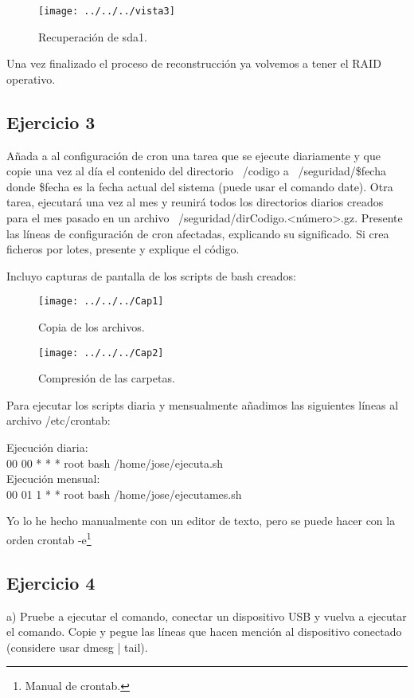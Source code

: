 \documentclass[a4paper, 11pt]{article} %
\begin{document}
\begin{figure}[htpb]
\centering
\texttt{[image: ../../../vista3]}
\caption{Recuperación de sda1.}
\end{figure}

Una vez finalizado el proceso de reconstrucción ya volvemos a tener el RAID operativo. 

\subsection{Ejercicio 3}
Añada a al configuración de cron una tarea que se ejecute diariamente y que copie una vez al día el contenido del directorio ~/codigo a ~/seguridad/\$fecha donde \$fecha es la fecha actual del sistema (puede usar el comando date). Otra tarea, ejecutará una vez al mes y reunirá todos los directorios diarios creados para el mes pasado en un archivo ~/seguridad/dirCodigo.<número>.gz. Presente las líneas de configuración de cron afectadas, explicando su significado. Si crea ficheros por lotes, presente y explique el código. 

Incluyo capturas de pantalla de los scripts de bash creados: 

\begin{figure}[htpb]
\centering
\texttt{[image: ../../../Cap1]}
\caption{Copia de los archivos.}
\end{figure}

\begin{figure}[htpb]
\centering
\texttt{[image: ../../../Cap2]}
\caption{Compresión de las carpetas.}
\end{figure}

Para ejecutar los scripts diaria y mensualmente añadimos las siguientes líneas al archivo /etc/crontab: 

Ejecución diaria:\\
00 00   * * *   root    bash /home/jose/ejecuta.sh\\
Ejecución mensual:\\
00 01   1 * *   root    bash /home/jose/ejecutames.sh

Yo lo he hecho manualmente con un editor de texto, pero se puede hacer con la orden crontab -e\footnote{Manual de crontab.}

\subsection{Ejercicio 4}
a) Pruebe a ejecutar el comando, conectar un dispositivo USB y vuelva a ejecutar el comando. Copie y pegue las líneas que hacen mención al dispositivo conectado (considere usar dmesg | tail). 
\end{document}
